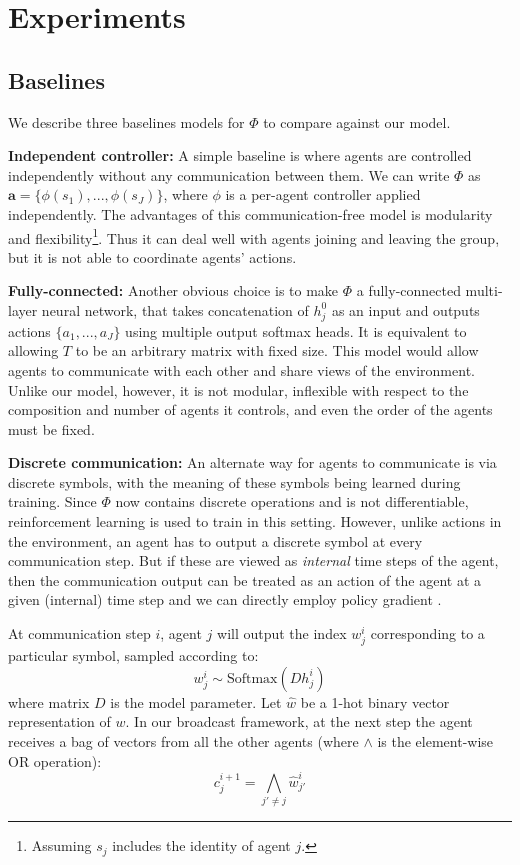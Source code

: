 \documentclass{article}
\begin{document}
\vspace{-2mm}
\section{Experiments}
\vspace{-2mm}

\subsection{Baselines}
\vspace{-2mm}
We describe three baselines models for $\Phi$ to compare against our model.

\textbf{Independent controller:}
A simple baseline is where agents are controlled independently 
without any communication between them.
We can write $\Phi$ as $\mathbf{a} = \{\phi(s_1),...,\phi(s_J)\}$,
where $\phi$ is a per-agent controller applied independently. 
The advantages of this communication-free model is modularity and 
flexibility\footnote{Assuming $s_j$ includes the identity of agent $j$.}.
Thus it can deal well with agents joining and leaving the group, 
but it is not able to coordinate agents' actions.

\textbf{Fully-connected:}
Another obvious choice is to make $\Phi$ a fully-connected multi-layer neural
network, that takes concatenation of $h_j^0$ as an input
and outputs actions $\{a_1,...,a_J\}$ using multiple output softmax heads. 
It is equivalent to allowing $T$ to be an arbitrary matrix with fixed size.
This model would allow agents to communicate with each other and share views of
the environment. Unlike our model, however, it is not modular, inflexible with
respect to the composition and number of agents it controls, and
even the order of the agents must be fixed.

\textbf{Discrete communication:}
An alternate way for agents to communicate is via discrete symbols,
with the meaning of these symbols being learned during training. 
Since $\Phi$ now contains discrete operations and is not differentiable, reinforcement
learning is used to train in this setting. However, unlike actions in the 
environment, an agent has to output a discrete symbol at every
communication step. But if these are viewed as \emph{internal} time steps of the
agent, then the communication output can be treated as an action of the
agent at a given (internal) time step and we can directly employ 
policy gradient \cite{Williams92simplestatistical}.

At communication step $i$, agent $j$ will output the index $w^i_j$
corresponding to a particular symbol, sampled according to: 
\begin{equation} w^i_j \sim \text{Softmax}(D h^{i}_j) \end{equation}
where matrix $D$ is the model parameter. Let $\hat{w}$ be a 1-hot binary
vector representation of $w$. In our broadcast framework, at the next step the agent
receives a bag of vectors from all the other agents (where $\wedge$ is the element-wise OR operation):
\begin{equation} c^{i+1}_j = \bigwedge_{j'\neq j} \hat{w}^i_{j'}   \label{eqn:dcom} \end{equation}
\end{document}

